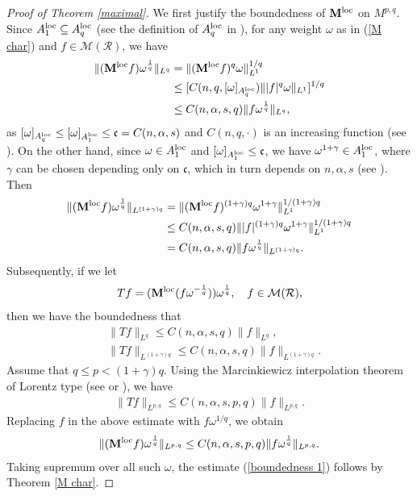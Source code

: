 \documentclass[10pt,reqno]{amsart}
\numberwithin{equation}{section}
\begin{document}
\begin{proof}[Proof of Theorem \ref{maximal}]
We first justify the boundedness of ${\bf M}^{\rm loc}$ on $M^{p,q}$. Since $A_{1}^{\rm loc}\subseteq A_{q}^{\rm loc}$ (see the definition of $A_{q}^{\rm loc}$ in \cite[Section 2]{OK4}), for any weight $\omega$ as in (\ref{M char}) and $f\in\mathcal{M}(\mathcal{R})$, we have 
\begin{align*}
\|({\bf M}^{\rm loc}f)\omega^{\frac{1}{q}}\|_{L^{q}}&=\|({\bf M}^{\rm loc}f)^{q}\omega\|_{L^{1}}^{1/q}\\
&\leq[C(n,q,[\omega]_{A_{q}^{\rm loc}})\||f|^{q}\omega\|_{L^{1}}]^{1/q}\\
&\leq C(n,\alpha,s,q)\|f\omega^{\frac{1}{q}}\|_{L^{q}},
\end{align*}
as $[\omega]_{A_{q}^{\rm loc}}\leq[\omega]_{A_{1}^{\rm loc}}\leq\mathfrak{c}=C(n,\alpha,s)$ and $C(n,q,\cdot)$ is an increasing function (see \cite[Theorem 2.3.7]{OK4}). On the other hand, since $\omega\in A_{1}^{\rm loc}$ and $[\omega]_{A_{1}^{\rm loc}}\leq\mathfrak{c}$, we have $\omega^{1+\gamma}\in A_{1}^{\rm loc}$, where $\gamma$ can be chosen depending only on $\mathfrak{c}$, which in turn depends on $n,\alpha,s$ (see \cite[Proof of Theorem 2.4.2 and Remark 2.4.3]{OK4}). Then
\begin{align*}
\|({\bf M}^{\rm loc}f)\omega^{\frac{1}{q}}\|_{L^{(1+\gamma)q}}&=\|({\bf M}^{\rm loc}f)^{(1+\gamma)q}\omega^{1+\gamma}\|_{L^{1}}^{1/(1+\gamma)q}\\
&\leq C(n,\alpha,s,q)\||f|^{(1+\gamma)q}\omega^{1+\gamma}\|_{L^{1}}^{1/(1+\gamma)q}\\
&=C(n,\alpha,s,q)\|f\omega^{\frac{1}{q}}\|_{L^{(1+\gamma)q}}.
\end{align*}
Subsequently, if we let 
\begin{align*}
Tf=({\bf M}^{\rm loc}(f\omega^{-\frac{1}{q}}))\omega^{\frac{1}{q}},\quad f\in\mathcal{M}(\mathcal{R}), 
\end{align*}
then we have the boundedness that 
\begin{align*}
&\|Tf\|_{L^{q}}\leq C(n,\alpha,s,q)\|f\|_{L^{q}},\\
&\|Tf\|_{L^{(1+\gamma)q}}\leq C(n,\alpha,s,q)\|f\|_{L^{(1+\gamma)q}}.
\end{align*}
Assume that $q\leq p<(1+\gamma)q$. Using the Marcinkiewicz interpolation theorem of Lorentz type (see \cite{HR} or \cite[Theorem 4.13]{BS}), we have 
\begin{align*}
\|Tf\|_{L^{p,q}}\leq C(n,\alpha,s,p,q)\|f\|_{L^{p,q}}.
\end{align*}
Replacing $f$ in the above estimate with $f\omega^{1/q}$, we obtain
\begin{align*}
\|({\bf M}^{\rm loc}f)\omega^{\frac{1}{q}}\|_{L^{p,q}}\leq C(n,\alpha,s,p,q)\|f\omega^{\frac{1}{q}}\|_{L^{p,q}}.
\end{align*}
Taking supremum over all such $\omega$, the estimate (\ref{boundedness 1}) follows by Theorem \ref{M char}.


\end{proof}
\end{document}

